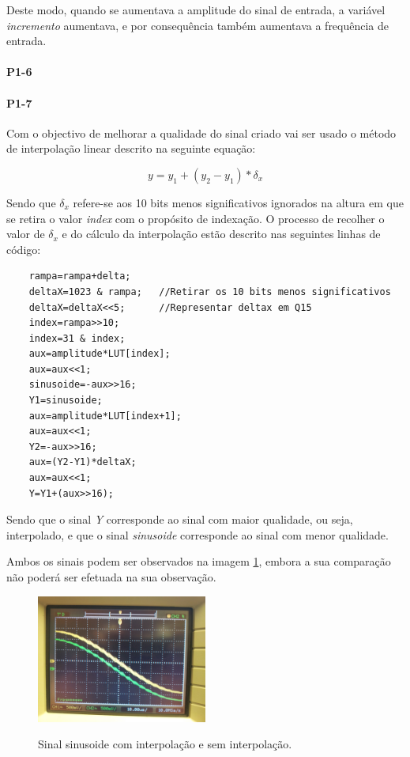 \documentclass[11pt]{article}
\begin{document}
Deste modo, quando se aumentava a amplitude do sinal de entrada, a variável \textit{incremento} aumentava, e por consequência também aumentava a frequência de entrada.

\paragraph{P1-6}
\label{para:P1-6}

\paragraph{P1-7}
\label{para:P1-7}

Com o objectivo de melhorar a qualidade do sinal criado vai ser usado o método de interpolação linear descrito na seguinte equação:

\begin{equation}
y=y_{1}+(y_{2}-y_{1})*\delta_{x}
\end{equation}

Sendo que $ \delta_{x} $ refere-se aos 10 bits menos significativos ignorados na altura em que se retira o valor \textit{index} com o propósito de indexação. O processo de recolher o valor de $ \delta_{x} $ e do cálculo da interpolação estão descrito nas seguintes linhas de código:

\begin{lstlisting}
	rampa=rampa+delta;
	deltaX=1023 & rampa;   //Retirar os 10 bits menos significativos
	deltaX=deltaX<<5;      //Representar deltax em Q15
	index=rampa>>10;
	index=31 & index; 
	aux=amplitude*LUT[index];
	aux=aux<<1;
	sinusoide=-aux>>16;
	Y1=sinusoide;
	aux=amplitude*LUT[index+1];
	aux=aux<<1;
	Y2=-aux>>16;
	aux=(Y2-Y1)*deltaX;
	aux=aux<<1;
	Y=Y1+(aux>>16);
\end{lstlisting}

Sendo que o sinal \textit{Y} corresponde ao sinal com maior qualidade, ou seja, interpolado, e que o sinal \textit{sinusoide} corresponde ao sinal com menor qualidade.

Ambos os sinais podem ser observados na imagem \ref{fig:interp}, embora a sua comparação não poderá ser efetuada na sua observação.


\begin{figure}[H]
	\centering
	\label{fig:interp}
	\includegraphics[width=0.5\textwidth]{./P1_interp}~\\
	\caption{Sinal sinusoide com interpolação e sem interpolação.}
\end{figure}
\end{document}
